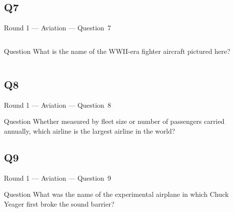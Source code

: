 \documentclass[11pt]{beamer}
\begin{document}
\subsection*{Q7}
\begin{frame}[t]{Round 1 --- Aviation --- \mbox{Question 7}}
    \vspace{-0.5em}
    \begin{columns}[T,totalwidth=\linewidth]
        \begin{column}{0.32\linewidth}
            \begin{block}{Question}
                What is the name of the WWII-era fighter aircraft pictured here?
            \end{block}
        \end{column}
        \begin{column}{0.65\linewidth}
            \begin{center}
                \texttt{[image: \{Images/spitfire]}.jpg}
            \end{center}
        \end{column}
    \end{columns}
\end{frame}
\subsection*{Q8}
\begin{frame}[t]{Round 1 --- Aviation --- \mbox{Question 8}}
    \vspace{-0.5em}
    \begin{block}{Question}
        Whether measured by fleet size or number of passengers carried annually, which airline is the largest airline in the world?
    \end{block}
\end{frame}
\subsection*{Q9}
\begin{frame}[t]{Round 1 --- Aviation --- \mbox{Question 9}}
    \vspace{-0.5em}
    \begin{block}{Question}
        What was the name of the experimental airplane in which Chuck Yeager first broke the sound barrier?
    \end{block}
\end{frame}
\end{document}
